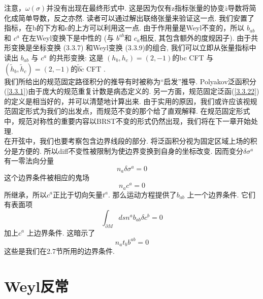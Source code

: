 注意，$\omega(\sigma)$并没有出现在最终形式中.  这是因为仅有z指标张量的协变$\bar{z}$导数将简化成简单导数，反之亦然. 读者可以通过解出联络张量来验证这一点. 我们安置了指标，在b的下方和c的上方可以利用这一点. 由于作用量是Weyl不变的，所以
 $b_{a b}$ 和 $c^{a}$ 在左Weyl变换下是中性的 (与 $b^{a b}$和 $c_{a}$相反, 其包含额外的度规因子). 由于共形变换是坐标变换 (3.3.7) 和Weyl变换 (3.3.9)的组合, 我们可以立即从张量指标中读出 $b_{a b}$ 与 $c^{a}$ 的共形变换: 这是 $\left(h_{b}, h_{c}\right)=(2,-1)$的bc CFT 与 $\left(\tilde{h}_{b}, \tilde{h}_{c}\right)=(2,-1)$的$\tilde{b} \tilde{c}$ CFT .\\
我们所给出的规范固定路径积分的推导有时被称为“启发”推导. Polyakov泛函积分(\ref{3.3.1})由于庞大的规范重复计数是病态定义的. 另一方面，规范固定泛函(\ref{3.3.22})的定义是相当好的，并可以清楚地计算出来. 由于实用的原因，我们或许应该视规范固定形式为我们的出发点，而规范不变的那个给了直观解释. 在规范固定形式中，规范对称性的重要内容以BRST不变的形式仍然出现，我们将在下一章开始处理. \\
在开弦中，我们也要考察包含边界线段的部分. 将泛函积分视为固定区域上场的积分是方便的. 所以diff不变性被限制为使边界变换到自身的坐标改变. 因而变分$\delta \sigma^{a}$ 有一零法向分量
\begin{equation}
n_{a} \delta \sigma^{a}=0
\end{equation}
这个边界条件被相应的鬼场
\begin{equation}
n_{a} c^{a}=0
\end{equation}
所继承，所以$c^{a}$正比于切向矢量$t^{a}$. 那么运动方程提供了$b_{a b}$ 上一个边界条件. 它们有表面项
\begin{equation}
\int_{\partial M} d s n^{a} b_{a b} \delta c^{b}=0
\end{equation}
加上$c^a$ 上边界条件. 这暗示了
\begin{equation}
n_{a} t_{b} b^{a b}=0
\end{equation}
这些是我们在2.7节所用的边界条件.

\section{Weyl反常}%


